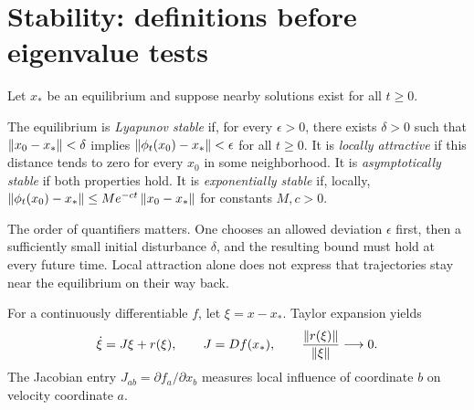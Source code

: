 \section{Stability: definitions before eigenvalue tests}
Let $x_*$ be an equilibrium and suppose nearby solutions exist for all $t\geq0$.
\begin{definition}\label{def:lyapunov-stability}
The equilibrium is \emph{Lyapunov stable} if, for every $\epsilon>0$, there exists $\delta>0$ such that $\left\lVert x_0-x_*\right\rVert<\delta$ implies $\left\lVert \phi_t(x_0)-x_*\right\rVert<\epsilon$ for all $t\geq0$. It is \emph{locally attractive} if this distance tends to zero for every $x_0$ in some neighborhood. It is \emph{asymptotically stable} if both properties hold. It is \emph{exponentially stable} if, locally, $\left\lVert \phi_t(x_0)-x_*\right\rVert\leq Me^{-ct}\left\lVert x_0-x_*\right\rVert$ for constants $M,c>0$.
\end{definition}
The order of quantifiers matters. One chooses an allowed deviation $\epsilon$ first, then a sufficiently small initial disturbance $\delta$, and the resulting bound must hold at every future time. Local attraction alone does not express that trajectories stay near the equilibrium on their way back.

For a continuously differentiable $f$, let $\xi=x-x_*$. Taylor expansion yields
\begin{equation}\label{eq:linearization}
\dot\xi=J\xi+r(\xi),\qquad J=Df(x_*),\qquad
\frac{\left\lVert r(\xi)\right\rVert}{\left\lVert \xi\right\rVert}\longrightarrow0.
\end{equation}
The Jacobian entry $J_{ab}=\partial f_a/\partial x_b$ measures local influence of coordinate $b$ on velocity coordinate $a$.

